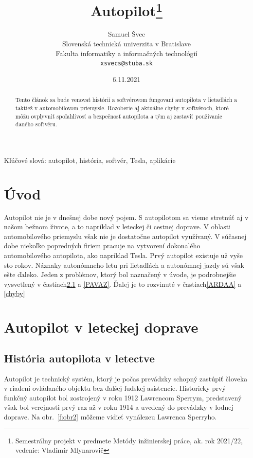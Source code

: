 \documentclass[10pt,twoside,slovak,a4paper]{article}
\title{Autopilot\thanks{Semestrálny projekt v predmete Metódy inžinierskej práce, ak. rok 2021/22, vedenie: Vladimír Mlynarovič}} %
\author{Samuel Švec\\[2pt]
	{\small Slovenská technická univerzita v Bratislave}\\
	{\small Fakulta informatiky a informačných technológií}\\
	{\small \texttt{xsvecs@stuba.sk}}
	}
\date{\small 6.11.2021} %
\begin{document}
\maketitle

\begin{abstract}
Tento článok sa bude venovať histórií a softvérovom fungovaní autopilota v lietadlách a taktiež v automobilovom priemysle. Rozoberie aj aktuálne chyby v softvéroch, ktoré môžu ovplyvniť spoľahlivosť a bezpečnosť autopilota a tým aj zastaviť používanie daného softvéru.
\end{abstract}

Kľúčové slová: autopilot, história, softvér, Tesla, aplikácie

\section{Úvod}

Autopilot nie je v dnešnej dobe nový pojem. S autopilotom sa vieme stretnúť aj v našom bežnom živote, a to napríklad v leteckej či cestnej doprave. V oblasti automobilového priemyslu však nie je dostatočne autopilot využívaný. V súčasnej dobe niekoľko popredných firiem pracuje na vytvorení dokonalého automobilového autopilota, ako napríklad Tesla. Prvý autopilot existuje už vyše sto rokov. Náznaky autonómneho letu pri lietadlách a autonómnej jazdy sú však ešte ďaleko. Jeden z problémov, ktorý bol naznačený v úvode, je podrobnejšie vysvetlený v častiach\ref{ALD} a \ref{PAVAZ}.
Ďalej je to rozvinuté v častiach\ref{ARDAA} a \ref{chyby}


\section{Autopilot v leteckej doprave} 

\subsection{História autopilota v letectve} \label{ALD}

Autopilot je technický systém, ktorý je počas prevádzky schopný zastúpiť človeka v riadení ovládaného objektu bez ďalšej ľudskej asistencie. Historicky prvý funkčný autopilot bol zostrojený v roku 1912 Lawrencom Sperrym, predstavený však bol verejnosti prvý raz až v roku 1914 a uvedený do prevádzky v lodnej doprave.\cite{HistoryAutopilot} Na obr.~\ref{f:obr2} môžeme vidieť vynálezcu Lawrenca Sperryho.
\end{document}
